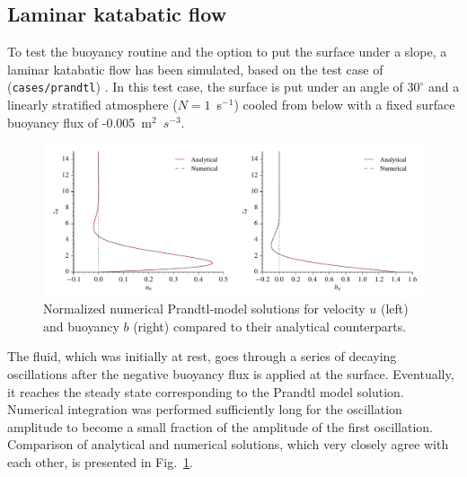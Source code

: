 \documentclass[gmd]{copernicus}
\begin{document}
\subsection{Laminar katabatic flow} \label{sec:laminarkatabatic}
To test the buoyancy routine and the option to put the surface under a slope, a laminar katabatic flow has been simulated, based on the test case of \citet{Prandtl1942} (\texttt{cases/prandtl}) . In this test case, the surface is put under an angle of $30^{\circ}$ and a linearly stratified atmosphere ($N = 1$~s$^{-1}$)  cooled from below with a fixed surface buoyancy flux of -0.005~m$^2$~$s^{-3}$.

\begin{figure}[t]
	\vspace*{2mm}
	\begin{center}
		\includegraphics[width=16.6cm]{figs/prandtl.pdf}
	\end{center}
	\caption{Normalized numerical Prandtl-model solutions for velocity $u$ (left) and buoyancy $b$ (right) compared to their analytical counterparts.}
	\label{fig:prandtl}
\end{figure}

The fluid, which was initially at rest, goes through a series of decaying oscillations after the negative buoyancy flux is applied at the surface. Eventually, it reaches the steady state corresponding to the Prandtl model solution. Numerical integration was performed sufficiently long for the oscillation amplitude to become a small fraction of the amplitude of the first oscillation. Comparison of analytical and numerical solutions, which very closely agree with each other, is presented in Fig.~\ref{fig:prandtl}.
\end{document}
